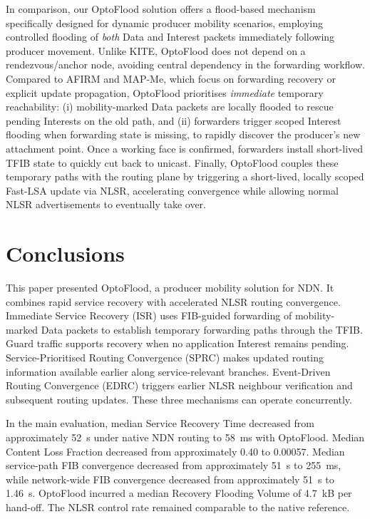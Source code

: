 \documentclass[10pt,conference]{IEEEtran}
\begin{document}
In comparison, our OptoFlood solution offers a flood-based mechanism specifically designed for dynamic producer mobility scenarios, employing controlled flooding of \emph{both} Data and Interest packets immediately following producer movement. Unlike KITE, OptoFlood does not depend on a rendezvous/anchor node, avoiding central dependency in the forwarding workflow. Compared to AFIRM and MAP-Me, which focus on forwarding recovery or explicit update propagation, OptoFlood prioritises \emph{immediate} temporary reachability: (i) mobility-marked Data packets are locally flooded to rescue pending Interests on the old path, and (ii) forwarders trigger scoped Interest flooding when forwarding state is missing, to rapidly discover the producer’s new attachment point. Once a working face is confirmed, forwarders install short-lived TFIB state to quickly cut back to unicast. Finally, OptoFlood couples these temporary paths with the routing plane by triggering a short-lived, locally scoped Fast-LSA update via NLSR, accelerating convergence while allowing normal NLSR advertisements to eventually take over.


\section{Conclusions}
\label{sec:conclusion}

This paper presented OptoFlood, a producer mobility solution for NDN. It combines rapid service recovery with accelerated NLSR routing convergence. Immediate Service Recovery (ISR) uses FIB-guided forwarding of mobility-marked Data packets to establish temporary forwarding paths through the TFIB. Guard traffic supports recovery when no application Interest remains pending. Service-Prioritised Routing Convergence (SPRC) makes updated routing information available earlier along service-relevant branches. Event-Driven Routing Convergence (EDRC) triggers earlier NLSR neighbour verification and subsequent routing updates. These three mechanisms can operate concurrently.

In the main evaluation, median Service Recovery Time decreased from approximately 52~s under native NDN routing to 58~ms with OptoFlood. Median Content Loss Fraction decreased from approximately 0.40 to 0.00057. Median service-path FIB convergence decreased from approximately 51~s to 255~ms, while network-wide FIB convergence decreased from approximately 51~s to 1.46~s. OptoFlood incurred a median Recovery Flooding Volume of 4.7~kB per hand-off. The NLSR control rate remained comparable to the native reference.
\end{document}
